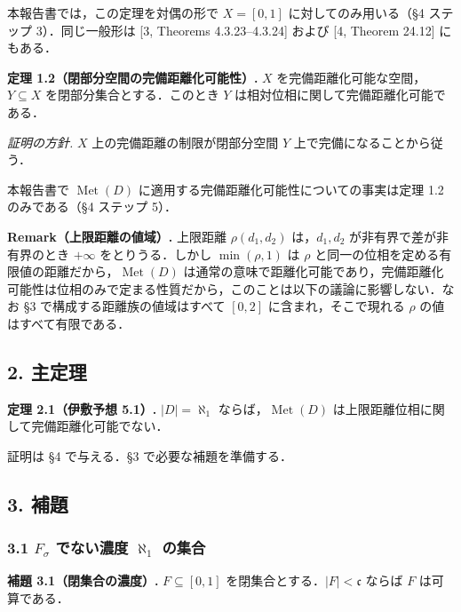 \documentclass[
  lualatex,ja=standard]{bxjsarticle}
\begin{document}
本報告書では，この定理を対偶の形で \(X = [0,1]\) に対してのみ用いる（§4
ステップ 3）．同じ一般形は {[}3, Theorems 4.3.23--4.3.24{]} および {[}4,
Theorem 24.12{]} にもある．

\textbf{定理 1.2（閉部分空間の完備距離化可能性）.} \(X\)
を完備距離化可能な空間，\(Y \subseteq X\) を閉部分集合とする．このとき
\(Y\) は相対位相に関して完備距離化可能である．

\emph{証明の方針.} \(X\) 上の完備距離の制限が閉部分空間 \(Y\)
上で完備になることから従う．

本報告書で \(\operatorname{Met}(D)\)
に適用する完備距離化可能性についての事実は定理 1.2 のみである（§4
ステップ 5）．

\textbf{Remark（上限距離の値域）.} 上限距離 \(\rho(d_1, d_2)\)
は，\(d_1, d_2\) が非有界で差が非有界のとき \(+\infty\)
をとりうる．しかし \(\min(\rho, 1)\) は \(\rho\)
と同一の位相を定める有限値の距離だから，\(\operatorname{Met}(D)\)
は通常の意味で距離化可能であり，完備距離化可能性は位相のみで定まる性質だから，このことは以下の議論に影響しない．なお
§3 で構成する距離族の値域はすべて \([0,2]\) に含まれ，そこで現れる
\(\rho\) の値はすべて有限である．

\hypertarget{ux4e3bux5b9aux7406}{%
\subsection{2. 主定理}\label{ux4e3bux5b9aux7406}}

\textbf{定理 2.1（伊敷予想 5.1）.} \(\lvert D\rvert = \aleph_1\)
ならば，\(\operatorname{Met}(D)\)
は上限距離位相に関して完備距離化可能でない．

証明は §4 で与える．§3 で必要な補題を準備する．

\hypertarget{ux88dcux984c}{%
\subsection{3. 補題}\label{ux88dcux984c}}

\hypertarget{f_sigma-ux3067ux306aux3044ux6fc3ux5ea6-aleph_1-ux306eux96c6ux5408}{%
\subsubsection{\texorpdfstring{3.1 \(F_\sigma\) でない濃度 \(\aleph_1\)
の集合}{3.1 F\_\textbackslash sigma でない濃度 \textbackslash aleph\_1 の集合}}\label{f_sigma-ux3067ux306aux3044ux6fc3ux5ea6-aleph_1-ux306eux96c6ux5408}}

\textbf{補題 3.1（閉集合の濃度）.} \(F \subseteq [0,1]\)
を閉集合とする．\(\lvert F\rvert < \mathfrak{c}\) ならば \(F\)
は可算である．
\end{document}
